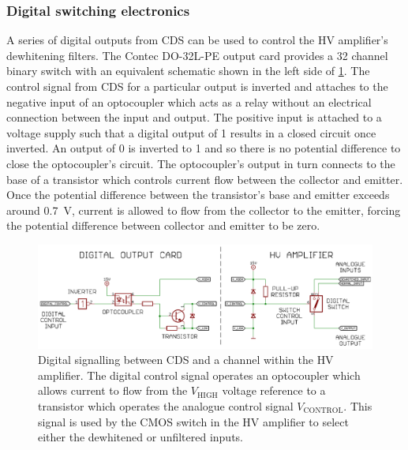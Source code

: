 \subsubsection{Digital switching electronics}
A series of digital outputs from \gls{CDS} can be used to control the \gls{HV} amplifier's dewhitening filters. The Contec DO-32L-PE output card provides a 32 channel binary switch with an equivalent schematic shown in the left side of \cref{fig:hv-amp-sigital-switching}. The control signal from \gls{CDS} for a particular output is inverted and attaches to the negative input of an optocoupler which acts as a relay without an electrical connection between the input and output. The positive input is attached to a voltage supply such that a digital output of \num{1} results in a closed circuit once inverted. An output of \num{0} is inverted to \num{1} and so there is no potential difference to close the optocoupler's circuit. The optocoupler's output in turn connects to the base of a transistor which controls current flow between the collector and emitter. Once the potential difference between the transistor's base and emitter exceeds around \SI{0.7}{\volt}, current is allowed to flow from the collector to the emitter, forcing the potential difference between collector and emitter to be zero.

\begin{figure}[htp]
  \centering
  \includegraphics[width=\columnwidth]{graphics/60-hv-amp-digital-switching.pdf}
  \caption[Digital signalling between the control and data acquisition system and a channel within the high voltage amplifier]{\label{fig:hv-amp-sigital-switching}Digital signalling between \gls{CDS} and a channel within the \gls{HV} amplifier. The digital control signal operates an optocoupler which allows current to flow from the $V_{\text{HIGH}}$ voltage reference to a transistor which operates the analogue control signal $V_{\text{CONTROL}}$. This signal is used by the \gls{CMOS} switch in the \gls{HV} amplifier to select either the dewhitened or unfiltered inputs.}
\end{figure}

